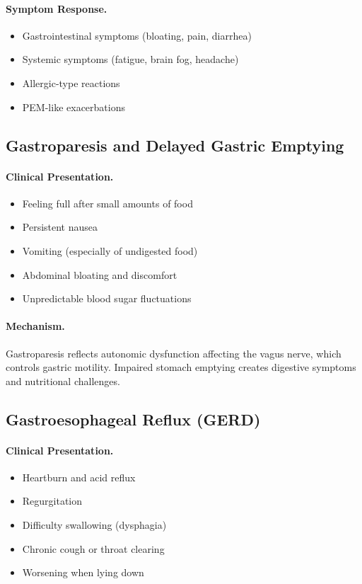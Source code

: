 \paragraph{Symptom Response.}
\begin{itemize}
    \item Gastrointestinal symptoms (bloating, pain, diarrhea)
    \item Systemic symptoms (fatigue, brain fog, headache)
    \item Allergic-type reactions
    \item PEM-like exacerbations
\end{itemize}

\subsection{Gastroparesis and Delayed Gastric Emptying}
\label{subsec:gastroparesis}

\paragraph{Clinical Presentation.}
\begin{itemize}
    \item Feeling full after small amounts of food
    \item Persistent nausea
    \item Vomiting (especially of undigested food)
    \item Abdominal bloating and discomfort
    \item Unpredictable blood sugar fluctuations
\end{itemize}

\paragraph{Mechanism.}
Gastroparesis reflects autonomic dysfunction affecting the vagus nerve, which controls gastric motility. Impaired stomach emptying creates digestive symptoms and nutritional challenges.

\subsection{Gastroesophageal Reflux (GERD)}
\label{subsec:gerd}

\paragraph{Clinical Presentation.}
\begin{itemize}
    \item Heartburn and acid reflux
    \item Regurgitation
    \item Difficulty swallowing (dysphagia)
    \item Chronic cough or throat clearing
    \item Worsening when lying down
\end{itemize}

